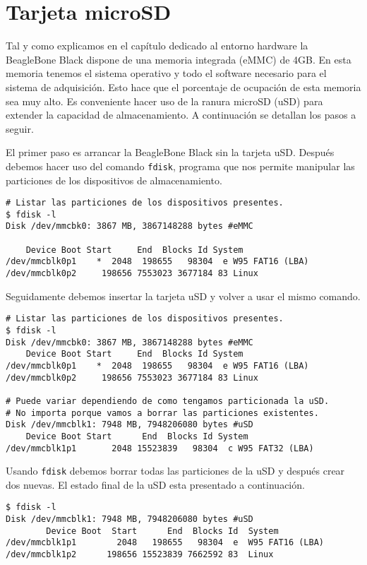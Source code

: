 	\section{Tarjeta microSD}
		Tal y como explicamos en el capítulo dedicado al entorno hardware la BeagleBone Black dispone de una memoria integrada (eMMC) de 4GB.
		En esta memoria tenemos el sistema operativo y todo el software necesario para el sistema de adquisición. Esto hace que el porcentaje
		de ocupación de esta memoria sea muy alto. Es conveniente hacer uso de la ranura microSD (uSD) para extender  la capacidad de
		almacenamiento. A continuación se detallan los pasos a seguir.
		\par
		El primer paso es arrancar la BeagleBone Black sin la tarjeta uSD. Después debemos hacer uso del comando \texttt{fdisk}, programa que
		nos permite manipular las particiones de los dispositivos de almacenamiento.
		\begin{lstlisting}[style=myBash]
# Listar las particiones de los dispositivos presentes.
$ fdisk -l
Disk /dev/mmcbk0: 3867 MB, 3867148288 bytes #eMMC

	Device Boot Start     End  Blocks Id System
/dev/mmcblk0p1    *  2048  198655   98304  e W95 FAT16 (LBA)
/dev/mmcblk0p2     198656 7553023 3677184 83 Linux
		\end{lstlisting}
		Seguidamente debemos insertar la tarjeta uSD y volver a usar el mismo comando.
		\begin{lstlisting}[style=myBash]
# Listar las particiones de los dispositivos presentes.
$ fdisk -l
Disk /dev/mmcbk0: 3867 MB, 3867148288 bytes #eMMC
	Device Boot Start     End  Blocks Id System
/dev/mmcblk0p1    *  2048  198655   98304  e W95 FAT16 (LBA)
/dev/mmcblk0p2     198656 7553023 3677184 83 Linux

# Puede variar dependiendo de como tengamos particionada la uSD.
# No importa porque vamos a borrar las particiones existentes.
Disk /dev/mmcblk1: 7948 MB, 7948206080 bytes #uSD
	Device Boot Start      End  Blocks Id System
/dev/mmcblk1p1       2048 15523839   98304  c W95 FAT32 (LBA)
		\end{lstlisting}
		Usando \texttt{fdisk} debemos borrar todas las particiones de la uSD y después crear dos nuevas. El estado final de la uSD esta
		presentado a continuación.
		\begin{lstlisting}[style=myBash]
$ fdisk -l
Disk /dev/mmcblk1: 7948 MB, 7948206080 bytes #uSD
        Device Boot  Start      End  Blocks Id  System
/dev/mmcblk1p1        2048   198655   98304  e  W95 FAT16 (LBA)
/dev/mmcblk1p2      198656 15523839 7662592 83  Linux
		\end{lstlisting}
